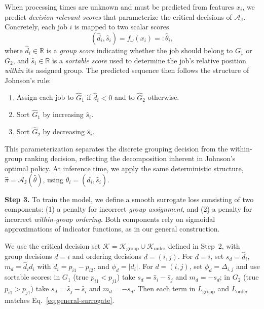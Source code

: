 \documentclass{article}
\begin{document}
When processing times are unknown and must be predicted from features $x_i$, we predict \emph{decision-relevant
scores} that parameterize the critical decisions of $\mathcal{A}_{\mathrm{J}}$.
Concretely, each job $i$ is mapped to two scalar scores
\[
(\hat{d}_i, \hat{s}_i) = f_\omega(x_i)=:\hat{\theta}_i,
\]
where $\hat{d}_i \in \mathbb{R}$ is a \emph{group score} indicating whether the
job should belong to $G_1$ or $G_2$, and $\hat{s}_i \in \mathbb{R}$ is a
\emph{sortable score} used to determine the job’s relative position \emph{within}
its assigned group.
The predicted sequence then follows the structure of Johnson’s rule:
\begin{enumerate}
    \item Assign each job to $\hat{G}_1$ if $\hat{d}_i < 0$ and to $\hat{G}_2$ otherwise.
    \item Sort $\hat{G}_1$ by increasing $\hat{s}_i$.
    \item Sort $\hat{G}_2$ by decreasing $\hat{s}_i$.
\end{enumerate} This parameterization separates the discrete grouping decision from the within-group ranking
decision, reflecting the decomposition inherent in Johnson’s optimal policy.
At inference time, we apply the same deterministic structure,
$\hat{\pi}=\mathcal{A}_{\mathrm{J}}(\hat{\theta})$, using $\hat{\theta}_i=(\hat{d}_i,\hat{s}_i)$.

\noindent\textbf{Step 3.} To train the model, we define a smooth surrogate loss consisting of two components:
(1) a penalty for incorrect \emph{group assignment}, and
(2) a penalty for incorrect \emph{within-group ordering}.
Both components rely on sigmoidal approximations of indicator functions, as in
our general construction. 

We use the critical decision set $\mathcal{K}=\mathcal{K}_{\mathrm{group}}\cup\mathcal{K}_{\mathrm{order}}$ defined in Step~2, with group decisions $d=i$ and ordering decisions $d=(i,j)$.
For $d=i$, set $s_d=\hat{d}_i$, $m_d=\hat{d}_i d_i$ with $d_i=p_{i1}-p_{i2}$, and
$\phi_d=|d_i|$.
For $d=(i,j)$, set $\phi_d=\Delta_{i,j}$ and use sortable scores:
in $G_1$ (true $p_{i1}<p_{j1}$) take $s_d=\hat{s}_i-\hat{s}_j$ and $m_d=-s_d$;
in $G_2$ (true $p_{i1}>p_{j1}$) take $s_d=\hat{s}_j-\hat{s}_i$ and $m_d=-s_d$.
Then each term in $L_{\mathrm{group}}$ and $L_{\mathrm{order}}$ matches
Eq.~\eqref{eq:general-surrogate}.
\end{document}
